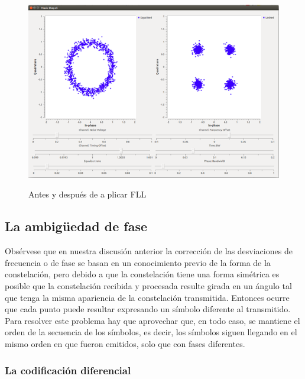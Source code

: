 \begin{figure}[h!]
	\captionsetup{justification = raggedright, singlelinecheck = false}
	\caption{Antes y después de a plicar FLL} 
	\centering
	\includegraphics[scale=0.9]{Imagenes/Bucle-costas.png}
	\label{fig:Bucle-costas}
\end{figure}

\subsection{La ambigüedad de fase}

Obsérvese que en nuestra discusión anterior la corrección de las desviaciones de frecuencia o de fase se basan en un conocimiento previo de la forma de la constelación, pero debido a que la constelación tiene una forma simétrica es posible que la constelación recibida y procesada resulte girada en un ángulo tal que tenga la misma apariencia de la constelación transmitida. Entonces ocurre que cada punto puede resultar expresando un símbolo diferente al transmitido. Para resolver este problema hay que aprovechar que, en todo caso, se mantiene el orden de la secuencia de los símbolos, es decir, los símbolos siguen llegando en el mismo orden en que fueron emitidos, solo que con fases diferentes. \\

\subsubsection{La codificación diferencial}

